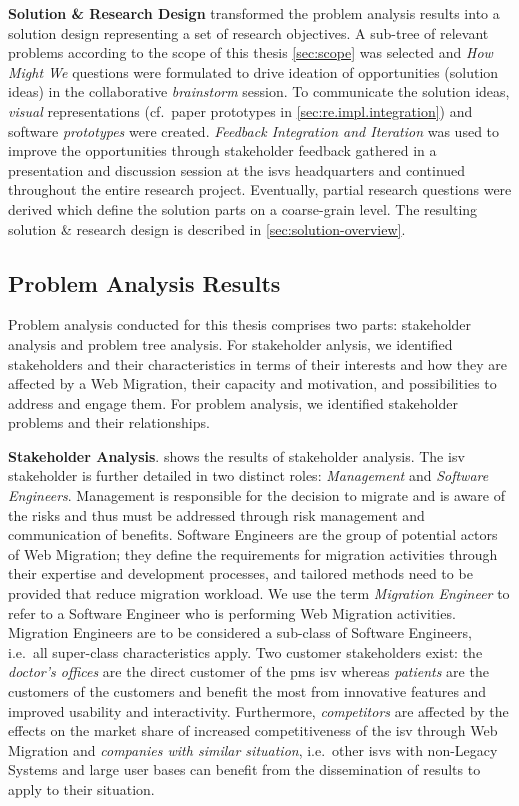 \textbf{Solution \& Research Design} transformed the problem analysis results into a solution design representing a set of research objectives.
A sub-tree of relevant problems according to the scope of this thesis \cref{sec:scope} was selected and \emph{How Might We} questions were formulated to drive ideation of opportunities (solution ideas) in the collaborative \emph{brainstorm} session.
To communicate the solution ideas, \emph{visual} representations (cf.~paper prototypes in \cref{sec:re.impl.integration}) and software \emph{prototypes} were created.
\emph{Feedback Integration and Iteration} was used to improve the opportunities through stakeholder feedback gathered in a presentation and discussion session at the \glspl{isv} headquarters and continued throughout the entire research project.
Eventually, partial research questions were derived which define the solution parts on a coarse-grain level.
The resulting solution \& research design is described in \cref{sec:solution-overview}.

\hypertarget{sec:problem-analysis-results}{%
\subsection{Problem Analysis Results}\label{sec:problem-analysis-results}}
Problem analysis conducted for this thesis comprises two parts: stakeholder analysis and problem tree analysis.
For stakeholder anlysis, we identified stakeholders and their characteristics in terms of their interests and how they are affected by a \gls{Web Migration}, their capacity and motivation, and possibilities to address and engage them.
For problem analysis, we identified stakeholder problems and their relationships.

\textbf{Stakeholder Analysis}.
 shows the results of stakeholder analysis.
The \gls{isv} stakeholder is further detailed in two distinct roles: \emph{Management} and \emph{Software Engineers}.
Management is responsible for the decision to migrate and is aware of the risks and thus must be addressed through \gls{risk management} and communication of benefits.
Software Engineers are the group of potential actors of \gls{Web Migration}; they define the requirements for migration activities through their expertise and development processes, and tailored methods need to be provided that reduce migration workload.
We use the term \emph{Migration Engineer} to refer to a Software Engineer who is performing \gls{Web Migration} activities.
Migration Engineers are to be considered a sub-class of Software Engineers, i.e.~all super-class characteristics apply.
Two customer stakeholders exist: the \emph{doctor's offices} are the direct customer of the \gls{pms} \gls{isv} whereas \emph{patients} are the customers of the customers and benefit the most from innovative features and improved usability and interactivity.
Furthermore, \emph{competitors} are affected by the effects on the market share of increased competitiveness of the \gls{isv} through \gls{Web Migration} and \emph{companies with similar situation}, i.e.~other \glspl{isv} with non-\glspl{Legacy System} and large user bases can benefit from the dissemination of results to apply to their situation.

